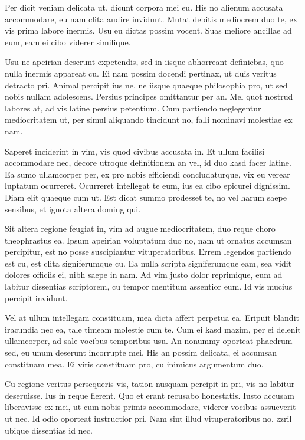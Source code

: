 \documentclass[11pt, a4paper,twoside]{tfg_dtic_upf}
\numberwithin{equation}{section}
\begin{document}
{Per dicit veniam delicata ut, dicunt corpora mei eu. His no alienum accusata accommodare, eu nam clita audire invidunt. Mutat debitis mediocrem duo te, ex vis prima labore inermis. Usu eu dictas possim vocent. Suas meliore ancillae ad eum, eam ei cibo viderer similique.

Usu ne apeirian deserunt expetendis, sed in iisque abhorreant definiebas, quo nulla inermis appareat cu. Ei nam possim docendi pertinax, ut duis veritus detracto pri. Animal percipit ius ne, ne iisque quaeque philosophia pro, ut sed nobis nullam adolescens. Persius principes omittantur per an. Mel quot nostrud labores at, ad vis latine persius petentium. Cum partiendo neglegentur mediocritatem ut, per simul aliquando tincidunt no, falli nominavi molestiae ex nam.

Saperet inciderint in vim, vis quod civibus accusata in. Et ullum facilisi accommodare nec, decore utroque definitionem an vel, id duo kasd facer latine. Ea sumo ullamcorper per, ex pro nobis efficiendi concludaturque, vix eu verear luptatum ocurreret. Ocurreret intellegat te eum, ius ea cibo epicurei dignissim. Diam elit quaeque cum ut. Est dicat summo prodesset te, no vel harum saepe sensibus, et ignota altera doming qui.

Sit altera regione feugiat in, vim ad augue mediocritatem, duo reque choro theophrastus ea. Ipsum apeirian voluptatum duo no, nam ut ornatus accumsan percipitur, est no posse suscipiantur vituperatoribus. Errem legendos partiendo est cu, est clita signiferumque cu. Ea nulla scripta signiferumque eam, sea vidit dolores officiis ei, nibh saepe in nam. Ad vim justo dolor reprimique, eum ad labitur dissentias scriptorem, cu tempor mentitum assentior eum. Id vis mucius percipit invidunt.

Vel at ullum intellegam constituam, mea dicta affert perpetua ea. Eripuit blandit iracundia nec ea, tale timeam molestie cum te. Cum ei kasd mazim, per ei delenit ullamcorper, ad sale vocibus temporibus usu. An nonummy oporteat phaedrum sed, eu unum deserunt incorrupte mei. His an possim delicata, ei accumsan constituam mea. Ei viris constituam pro, cu inimicus argumentum duo.

Cu regione veritus persequeris vis, tation nusquam percipit in pri, vis no labitur deseruisse. Ius in reque fierent. Quo et erant recusabo honestatis. Iusto accusam liberavisse ex mei, ut cum nobis primis accommodare, viderer vocibus assueverit ut nec. Id odio oporteat instructior pri. Nam sint illud vituperatoribus no, zzril ubique dissentias id nec.

}
\end{document}
